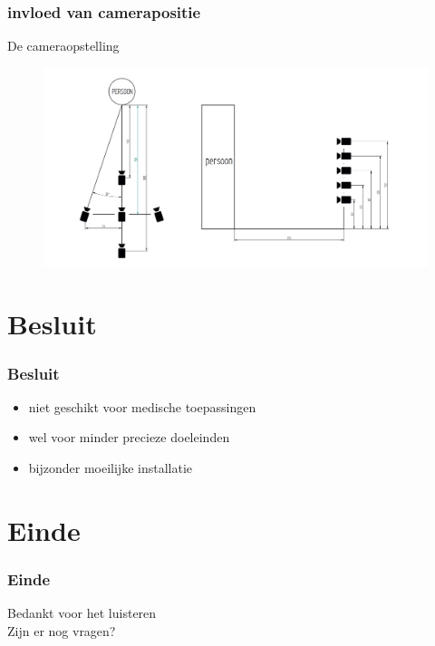 \documentclass
   [kulak] %
   {kulakbeamer}
\begin{document}
\begin{frame}
	\frametitle{invloed van camerapositie}
	De cameraopstelling
	\begin{figure}
		\includegraphics[width= \textwidth]{cameraopstelling}
	\end{figure}
\end{frame}

\section{Besluit}

\begin{frame}
\frametitle{Besluit}
\begin{itemize}
	\item niet geschikt voor medische toepassingen
	\item wel voor minder precieze doeleinden
	\item bijzonder moeilijke installatie
\end{itemize}
\end{frame}

\section*{Einde}
\begin{frame}
\frametitle{Einde}
\begin{center}
	Bedankt voor het luisteren\\
	Zijn er nog vragen?
\end{center}
\end{frame}
\end{document}
